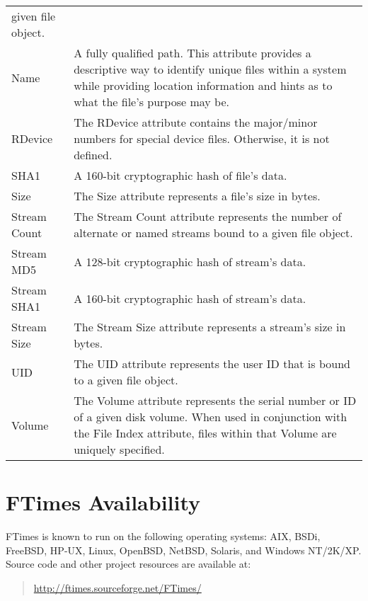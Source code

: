 \documentclass[10pt]{article}
\begin{document}
\begin{center}
\begin{supertabular}{lp{4.75in}}
given file object.
\\[.5em]
Name
&
A fully qualified path.  This attribute provides a descriptive way
to identify unique files within a system while providing location
information and hints as to what the file's purpose may be.
\\[.5em]
RDevice
&
The RDevice attribute contains the major/minor numbers for special
device files.  Otherwise, it is not defined.
\\[.5em]
SHA1
&
A 160-bit cryptographic hash of file's data.
\\[.5em]
Size
&
The Size attribute represents a file's size in bytes.
\\[.5em]
Stream Count
&
The Stream Count attribute represents the number of alternate or
named streams bound to a given file object.
\\[.5em]
Stream MD5
&
A 128-bit cryptographic hash of stream's data.
\\[.5em]
Stream SHA1
&
A 160-bit cryptographic hash of stream's data.
\\[.5em]
Stream Size
&
The Stream Size attribute represents a stream's size in bytes.
\\[.5em]
UID
&
The UID attribute represents the user ID that is bound to a given
file object.
\\[.5em]
Volume
&
The Volume attribute represents the serial number or ID of a given
disk volume.  When used in conjunction with the File Index attribute,
files within that Volume are uniquely specified.
\\[.5em]
\end{supertabular}
\end{center}

\section{FTimes Availability}

FTimes is known to run on the following operating systems: AIX, BSDi,
FreeBSD, HP-UX, Linux, OpenBSD, NetBSD, Solaris, and Windows NT/2K/XP.
Source code and other project resources are available at:

\begin{quote}

  \url{http://ftimes.sourceforge.net/FTimes/}

\end{quote}



\end{document}
